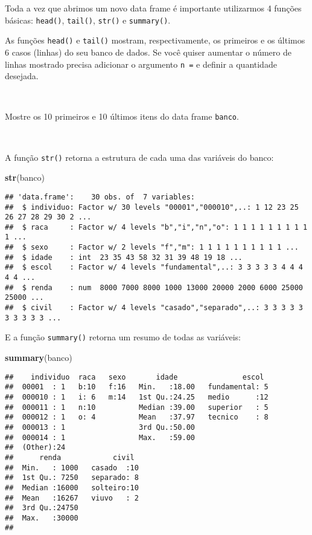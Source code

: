 \documentclass[]{book}
\newenvironment{Shaded}{\begin{snugshade}}{\end{snugshade}}
\newcommand{\KeywordTok}[1]{\textcolor[rgb]{0.13,0.29,0.53}{\textbf{#1}}}
\newcommand{\NormalTok}[1]{#1}
\theoremstyle{definition}
\theoremstyle{definition}
\theoremstyle{definition}
\theoremstyle{remark}
\let\BeginKnitrBlock\begin \let\EndKnitrBlock\end
\begin{document}
Toda a vez que abrimos um novo data frame é importante utilizarmos 4 funções básicas: \texttt{head()}, \texttt{tail()}, \texttt{str()} e \texttt{summary()}.

As funções \texttt{head()} e \texttt{tail()} mostram, respectivamente, os primeiros e os últimos 6 casos (linhas) do seu banco de dados. Se você quiser aumentar o número de linhas mostrado precisa adicionar o argumento \texttt{n\ =} e definir a quantidade desejada.

~
\BeginKnitrBlock{exercise}
\protect\hypertarget{exr:unnamed-chunk-71}{}{\label{exr:unnamed-chunk-71} }Mostre os 10 primeiros e 10 últimos itens do data frame \texttt{banco}.
\EndKnitrBlock{exercise}

~

A função \texttt{str()} retorna a estrutura de cada uma das variáveis do banco:

\begin{Shaded}
\begin{Highlighting}[]
\KeywordTok{str}\NormalTok{(banco)}
\end{Highlighting}
\end{Shaded}

\begin{verbatim}
## 'data.frame':    30 obs. of  7 variables:
##  $ individuo: Factor w/ 30 levels "00001","000010",..: 1 12 23 25 26 27 28 29 30 2 ...
##  $ raca     : Factor w/ 4 levels "b","i","n","o": 1 1 1 1 1 1 1 1 1 1 ...
##  $ sexo     : Factor w/ 2 levels "f","m": 1 1 1 1 1 1 1 1 1 1 ...
##  $ idade    : int  23 35 43 58 32 31 39 48 19 18 ...
##  $ escol    : Factor w/ 4 levels "fundamental",..: 3 3 3 3 3 4 4 4 4 4 ...
##  $ renda    : num  8000 7000 8000 1000 13000 20000 2000 6000 25000 25000 ...
##  $ civil    : Factor w/ 4 levels "casado","separado",..: 3 3 3 3 3 3 3 3 3 3 ...
\end{verbatim}

E a função \texttt{summary()} retorna um resumo de todas as variáveis:

\begin{Shaded}
\begin{Highlighting}[]
\KeywordTok{summary}\NormalTok{(banco)}
\end{Highlighting}
\end{Shaded}

\begin{verbatim}
##    individuo  raca   sexo       idade               escol   
##  00001  : 1   b:10   f:16   Min.   :18.00   fundamental: 5  
##  000010 : 1   i: 6   m:14   1st Qu.:24.25   medio      :12  
##  000011 : 1   n:10          Median :39.00   superior   : 5  
##  000012 : 1   o: 4          Mean   :37.97   tecnico    : 8  
##  000013 : 1                 3rd Qu.:50.00                   
##  000014 : 1                 Max.   :59.00                   
##  (Other):24                                                 
##      renda            civil   
##  Min.   : 1000   casado  :10  
##  1st Qu.: 7250   separado: 8  
##  Median :16000   solteiro:10  
##  Mean   :16267   viuvo   : 2  
##  3rd Qu.:24750                
##  Max.   :30000                
## 
\end{verbatim}
\end{document}
